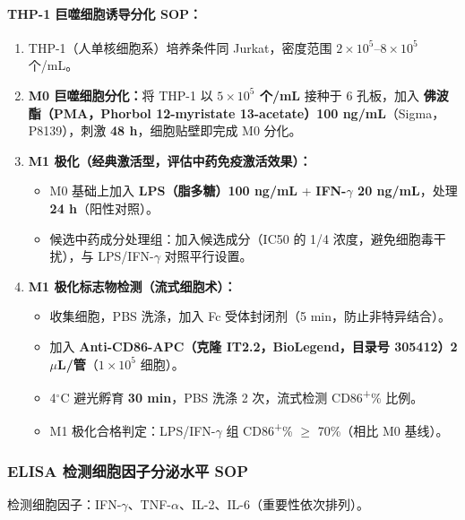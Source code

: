 \documentclass[12pt,a4paper,twoside]{article}
\begin{document}
\paragraph{THP-1 巨噬细胞诱导分化 SOP：}

\begin{enumerate}
  \item THP-1（人单核细胞系）培养条件同 Jurkat，密度范围 $2 \times 10^5$--$8 \times 10^5$ 个/mL。
  \item \textbf{M0 巨噬细胞分化：}将 THP-1 以 \textbf{$5 \times 10^5$ 个/mL} 接种于 6 孔板，加入 \textbf{佛波酯（PMA，Phorbol 12-myristate 13-acetate）100 ng/mL}（Sigma，P8139），刺激 \textbf{48 h}，细胞贴壁即完成 M0 分化。
  \item \textbf{M1 极化（经典激活型，评估中药免疫激活效果）：}
    \begin{itemize}
      \item M0 基础上加入 \textbf{LPS（脂多糖）100 ng/mL} + \textbf{IFN-$\gamma$ 20 ng/mL}，处理 \textbf{24 h}（阳性对照）。
      \item 候选中药成分处理组：加入候选成分（IC50 的 1/4 浓度，避免细胞毒干扰），与 LPS/IFN-$\gamma$ 对照平行设置。
    \end{itemize}
  \item \textbf{M1 极化标志物检测（流式细胞术）：}
    \begin{itemize}
      \item 收集细胞，PBS 洗涤，加入 Fc 受体封闭剂（5 min，防止非特异结合）。
      \item 加入 \textbf{Anti-CD86-APC（克隆 IT2.2，BioLegend，目录号 305412）2 $\mu$L/管}（$1 \times 10^5$ 细胞）。
      \item 4$^{\circ}$C 避光孵育 \textbf{30 min}，PBS 洗涤 2 次，流式检测 CD86\textsuperscript{+}\% 比例。
      \item M1 极化合格判定：LPS/IFN-$\gamma$ 组 CD86\textsuperscript{+}\% $\geq$ 70\%（相比 M0 基线）。
    \end{itemize}
\end{enumerate}

\subsubsection{ELISA 检测细胞因子分泌水平 SOP}

检测细胞因子：IFN-$\gamma$、TNF-$\alpha$、IL-2、IL-6（重要性依次排列）。
\end{document}
